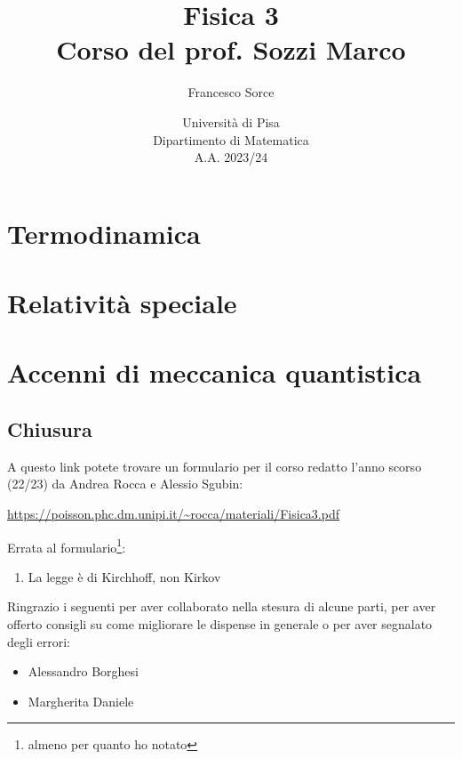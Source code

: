 \documentclass[a4paper]{report}
\title{Fisica 3\\
\large Corso del prof. Sozzi Marco}
\author{Francesco Sorce}
\date{Università di Pisa\\
Dipartimento di Matematica\\
A.A. 2023/24}
\begin{document}
\maketitle

\tableofcontents
\newpage


\part{Termodinamica}








\part{Relativit\`a speciale}




\part{Accenni di meccanica quantistica}







\appendix


\chapter{Chiusura}
A questo link potete trovare un formulario per il corso redatto l'anno scorso (22/23) da Andrea Rocca e Alessio Sgubin:
\begin{center}
\url{https://poisson.phc.dm.unipi.it/~rocca/materiali/Fisica3.pdf}
\end{center}

\bigskip 

\noindent Errata al formulario\footnote{almeno per quanto ho notato}:
\begin{enumerate}
\item La legge \`e di Kirchhoff, non Kirkov
\end{enumerate}

\vspace*{1cm}

\noindent
Ringrazio i seguenti per aver collaborato nella stesura di alcune parti, per aver offerto consigli su come migliorare le dispense in generale o per aver segnalato degli errori:
\begin{itemize}
\item Alessandro Borghesi
\item Margherita Daniele
\end{itemize}
\end{document}
